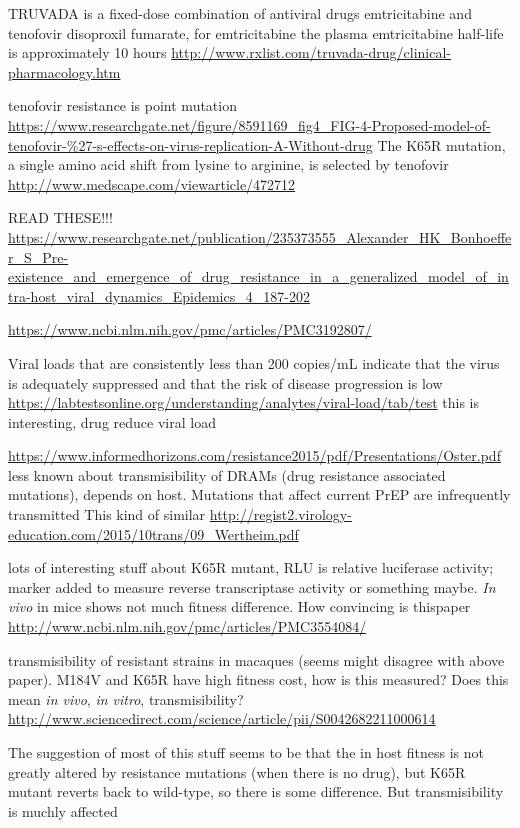 \documentclass[DIV=15]{scrartcl}
\begin{document}
TRUVADA is a fixed-dose combination of antiviral drugs emtricitabine and tenofovir disoproxil fumarate, for emtricitabine the plasma emtricitabine half-life is approximately 10 hours
\url{http://www.rxlist.com/truvada-drug/clinical-pharmacology.htm}

tenofovir resistance is point mutation
\url{https://www.researchgate.net/figure/8591169_fig4_FIG-4-Proposed-model-of-tenofovir-%27-s-effects-on-virus-replication-A-Without-drug}
The K65R mutation, a single amino acid shift from lysine to arginine, is selected by tenofovir
\url{http://www.medscape.com/viewarticle/472712}



READ THESE!!!
\url{https://www.researchgate.net/publication/235373555_Alexander_HK_Bonhoeffer_S_Pre-existence_and_emergence_of_drug_resistance_in_a_generalized_model_of_intra-host_viral_dynamics_Epidemics_4_187-202}

\url{https://www.ncbi.nlm.nih.gov/pmc/articles/PMC3192807/}


Viral loads that are consistently less than 200 copies/mL indicate that the virus is adequately suppressed and that the risk of disease progression is low
\url{https://labtestsonline.org/understanding/analytes/viral-load/tab/test}
this is interesting, drug reduce viral load


\url{https://www.informedhorizons.com/resistance2015/pdf/Presentations/Oster.pdf}
less known about transmisibility of DRAMs (drug resistance associated mutations), depends on host. Mutations that affect current PrEP are infrequently transmitted
 This kind of similar
 \url{http://regist2.virology-education.com/2015/10trans/09_Wertheim.pdf}
 
 
 lots of interesting stuff about K65R mutant, RLU is relative luciferase activity; marker added to measure reverse transcriptase activity or something maybe. \textit{In vivo} in mice shows not much fitness difference. How convincing is thispaper
 \url{http://www.ncbi.nlm.nih.gov/pmc/articles/PMC3554084/}


transmisibility of resistant strains in macaques (seems might disagree with above paper). M184V and K65R have high fitness cost, how is this measured? Does this mean \textit{in vivo}, \textit{in vitro}, transmisibility?
\url{http://www.sciencedirect.com/science/article/pii/S0042682211000614}

The suggestion of most of this stuff seems to be that the in host fitness is not greatly altered by resistance mutations (when there is no drug), but    K65R mutant reverts back to wild-type, so there is some difference. But transmisibility is muchly affected \cite{chateau2013}
\end{document}
